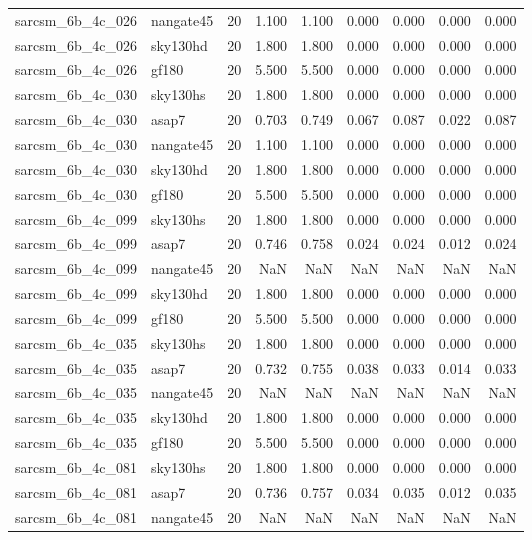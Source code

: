 \begin{tabular}{llrrrrrrr}
sarcsm\_6b\_4c\_026 & nangate45 & 20 & 1.100 & 1.100 & 0.000 & 0.000 & 0.000 & 0.000 \\
sarcsm\_6b\_4c\_026 & sky130hd & 20 & 1.800 & 1.800 & 0.000 & 0.000 & 0.000 & 0.000 \\
sarcsm\_6b\_4c\_026 & gf180 & 20 & 5.500 & 5.500 & 0.000 & 0.000 & 0.000 & 0.000 \\
sarcsm\_6b\_4c\_030 & sky130hs & 20 & 1.800 & 1.800 & 0.000 & 0.000 & 0.000 & 0.000 \\
sarcsm\_6b\_4c\_030 & asap7 & 20 & 0.703 & 0.749 & 0.067 & 0.087 & 0.022 & 0.087 \\
sarcsm\_6b\_4c\_030 & nangate45 & 20 & 1.100 & 1.100 & 0.000 & 0.000 & 0.000 & 0.000 \\
sarcsm\_6b\_4c\_030 & sky130hd & 20 & 1.800 & 1.800 & 0.000 & 0.000 & 0.000 & 0.000 \\
sarcsm\_6b\_4c\_030 & gf180 & 20 & 5.500 & 5.500 & 0.000 & 0.000 & 0.000 & 0.000 \\
sarcsm\_6b\_4c\_099 & sky130hs & 20 & 1.800 & 1.800 & 0.000 & 0.000 & 0.000 & 0.000 \\
sarcsm\_6b\_4c\_099 & asap7 & 20 & 0.746 & 0.758 & 0.024 & 0.024 & 0.012 & 0.024 \\
sarcsm\_6b\_4c\_099 & nangate45 & 20 & NaN & NaN & NaN & NaN & NaN & NaN \\
sarcsm\_6b\_4c\_099 & sky130hd & 20 & 1.800 & 1.800 & 0.000 & 0.000 & 0.000 & 0.000 \\
sarcsm\_6b\_4c\_099 & gf180 & 20 & 5.500 & 5.500 & 0.000 & 0.000 & 0.000 & 0.000 \\
sarcsm\_6b\_4c\_035 & sky130hs & 20 & 1.800 & 1.800 & 0.000 & 0.000 & 0.000 & 0.000 \\
sarcsm\_6b\_4c\_035 & asap7 & 20 & 0.732 & 0.755 & 0.038 & 0.033 & 0.014 & 0.033 \\
sarcsm\_6b\_4c\_035 & nangate45 & 20 & NaN & NaN & NaN & NaN & NaN & NaN \\
sarcsm\_6b\_4c\_035 & sky130hd & 20 & 1.800 & 1.800 & 0.000 & 0.000 & 0.000 & 0.000 \\
sarcsm\_6b\_4c\_035 & gf180 & 20 & 5.500 & 5.500 & 0.000 & 0.000 & 0.000 & 0.000 \\
sarcsm\_6b\_4c\_081 & sky130hs & 20 & 1.800 & 1.800 & 0.000 & 0.000 & 0.000 & 0.000 \\
sarcsm\_6b\_4c\_081 & asap7 & 20 & 0.736 & 0.757 & 0.034 & 0.035 & 0.012 & 0.035 \\
sarcsm\_6b\_4c\_081 & nangate45 & 20 & NaN & NaN & NaN & NaN & NaN & NaN \\

\end{tabular}
